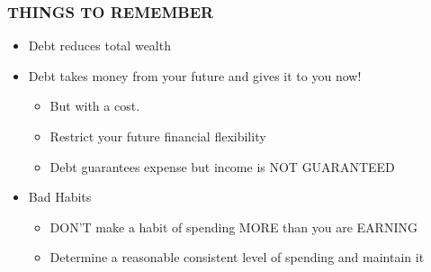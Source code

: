 \documentclass[12pt]{article}
\begin{document}
            \subsubsection{THINGS TO REMEMBER}
                \begin{itemize}
                    \item Debt reduces total wealth
                    \item Debt takes money from your future and gives it to you now!
                        \begin{itemize}
                            \item But with a cost.
                            \item Restrict your future financial flexibility
                            \item Debt guarantees expense but income is NOT GUARANTEED
                        \end{itemize}
                    \item Bad Habits
                        \begin{itemize}
                            \item DON'T make a habit of spending MORE than you are EARNING
                            \item Determine a reasonable consistent level of spending and maintain it
                        \end{itemize}
                \end{itemize}
\end{document}
